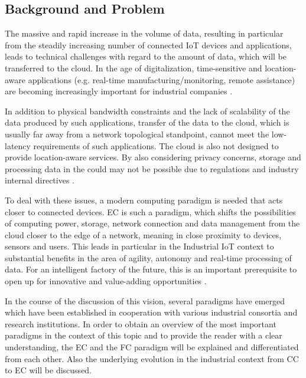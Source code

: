 \subsection{Background and Problem}\label{2.1}
The massive and rapid increase in the volume of data, resulting in particular from the steadily increasing number of connected IoT devices and applications, leads to technical challenges with regard to the amount of data, which will be transferred to the cloud. In the age of digitalization, time-sensitive and location-aware applications (e.g. real-time manufacturing/monitoring, remote assistance) are becoming increasingly important for industrial companies \cite{yousefpour2019all}.\par
In addition to physical bandwidth constraints and the lack of scalability of the data produced by such applications, transfer of the data to the cloud, which is usually far away from a network topological standpoint, cannot meet the low-latency requirements of such applications. The cloud is also not designed to provide location-aware services. By also considering privacy concerns, storage and processing data in the could may not be possible due to regulations and industry internal directives \cite{yousefpour2019all}.\par
To deal with these issues, a modern computing paradigm is needed that acts closer to connected devices. EC is such a paradigm, which shifts the possibilities of computing power, storage, network connection and data management from the cloud closer to the edge of a network, meaning in close proximity to devices, sensors and users. This leads in particular in the Industrial IoT context to substantial benefits in the area of agility, autonomy and real-time processing of data. For an intelligent factory of the future, this is an important prerequisite to open up for innovative and value-adding opportunities \cite{chen2018edge}.\par 
In the course of the discussion of this vision, several paradigms have emerged which have been established in cooperation with various industrial consortia and research institutions. In order to obtain an overview of the most important paradigms in the context of this topic and to provide the reader with a clear understanding, the EC and the FC paradigm will be explained and differentiated from each other. Also the underlying evolution in the industrial context from CC to EC will be discussed.

